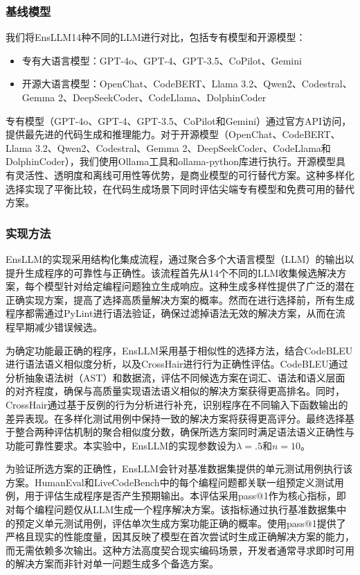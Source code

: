 \documentclass{article}
\newcommand{\tool}{EnsLLM}
\begin{document}
\begin{CJK*}{UTF8}{gbsn}
\subsubsection{基线模型}
\leavevmode\par
我们将\tool\与14种不同的LLM进行对比，包括专有模型和开源模型：
\begin{itemize}
    \item 专有大语言模型：GPT-4o、GPT-4、GPT-3.5、CoPilot、Gemini
    \item 开源大语言模型：OpenChat、CodeBERT、Llama 3.2、Qwen2、Codestral、Gemma 2、DeepSeekCoder、CodeLlama、DolphinCoder
\end{itemize}

专有模型（GPT-4o、GPT-4、GPT-3.5、CoPilot和Gemini）通过官方API访问，提供最先进的代码生成和推理能力。对于开源模型（OpenChat、CodeBERT、Llama 3.2、Qwen2、Codestral、Gemma 2、DeepSeekCoder、CodeLlama和DolphinCoder），我们使用Ollama工具和ollama-python库进行执行。开源模型具有灵活性、透明度和离线可用性等优势，是商业模型的可行替代方案。这种多样化选择实现了平衡比较，在代码生成场景下同时评估尖端专有模型和免费可用的替代方案。
\subsubsection{实现方法}
\leavevmode\par
\tool 的实现采用结构化集成流程，通过聚合多个大语言模型（LLM）的输出以提升生成程序的可靠性与正确性。该流程首先从14个不同的LLM收集候选解决方案，每个模型针对给定编程问题独立生成响应。这种生成多样性提供了广泛的潜在正确实现方案，提高了选择高质量解决方案的概率。然而在进行选择前，所有生成程序都需通过PyLint进行语法验证，确保过滤掉语法无效的解决方案，从而在流程早期减少错误候选。

为确定功能最正确的程序，\tool 采用基于相似性的选择方法，结合CodeBLEU进行语法语义相似度分析，以及CrossHair进行行为正确性评估。CodeBLEU通过分析抽象语法树（AST）和数据流，评估不同候选方案在词汇、语法和语义层面的对齐程度，确保与高质量实现语法语义相似的解决方案获得更高排名。同时，CrossHair通过基于反例的行为分析进行补充，识别程序在不同输入下函数输出的差异表现。在多样化测试用例中保持一致的解决方案将获得更高评分。最终选择基于整合两种评估机制的聚合相似度分数，确保所选方案同时满足语法语义正确性与功能可靠性要求。本实验中，\tool 的实现参数设为$\lambda = .5$和$n = 10$。

为验证所选方案的正确性，\tool 会针对基准数据集提供的单元测试用例执行该方案。HumanEval和LiveCodeBench中的每个编程问题都关联一组预定义测试用例，用于评估生成程序是否产生预期输出。本评估采用pass@1作为核心指标，即对每个编程问题仅从LLM生成一个程序解决方案。该指标通过执行基准数据集中的预定义单元测试用例，评估单次生成方案功能正确的概率。使用pass@1提供了严格且现实的性能度量，因其反映了模型在首次尝试时生成正确解决方案的能力，而无需依赖多次输出。这种方法高度契合现实编码场景，开发者通常寻求即时可用的解决方案而非针对单一问题生成多个备选方案。


\end{CJK*}
\end{document}
